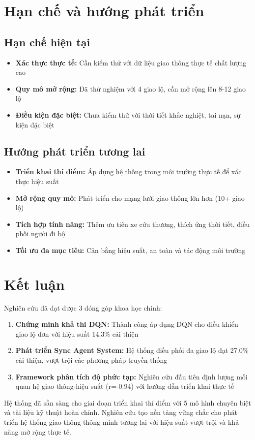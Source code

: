 \section{Hạn chế và hướng phát triển}

\subsection{Hạn chế hiện tại}
\begin{itemize}
    \item \textbf{Xác thực thực tế:} Cần kiểm thử với dữ liệu giao thông thực tế chất lượng cao
    \item \textbf{Quy mô mở rộng:} Đã thử nghiệm với 4 giao lộ, cần mở rộng lên 8-12 giao lộ
    \item \textbf{Điều kiện đặc biệt:} Chưa kiểm thử với thời tiết khắc nghiệt, tai nạn, sự kiện đặc biệt
\end{itemize}

\subsection{Hướng phát triển tương lai}
\begin{itemize}
    \item \textbf{Triển khai thí điểm:} Áp dụng hệ thống trong môi trường thực tế để xác thực hiệu suất
    \item \textbf{Mở rộng quy mô:} Phát triển cho mạng lưới giao thông lớn hơn (10+ giao lộ)
    \item \textbf{Tích hợp tính năng:} Thêm ưu tiên xe cứu thương, thích ứng thời tiết, điều phối người đi bộ
    \item \textbf{Tối ưu đa mục tiêu:} Cân bằng hiệu suất, an toàn và tác động môi trường
\end{itemize}

\section{Kết luận}

Nghiên cứu đã đạt được 3 đóng góp khoa học chính:

\begin{enumerate}
    \item \textbf{Chứng minh khả thi DQN:} Thành công áp dụng DQN cho điều khiển giao lộ đơn với hiệu suất 14.3\% cải thiện

    \item \textbf{Phát triển Sync Agent System:} Hệ thống điều phối đa giao lộ đạt 27.0\% cải thiện, vượt trội các phương pháp truyền thống

    \item \textbf{Framework phân tích độ phức tạp:} Nghiên cứu đầu tiên định lượng mối quan hệ giao thông-hiệu suất (r=-0.94) với hướng dẫn triển khai thực tế
\end{enumerate}

Hệ thống đã sẵn sàng cho giai đoạn triển khai thí điểm với 5 mô hình chuyên biệt và tài liệu kỹ thuật hoàn chỉnh. Nghiên cứu tạo nền tảng vững chắc cho phát triển hệ thống giao thông thông minh tương lai với hiệu suất vượt trội và khả năng mở rộng thực tế.